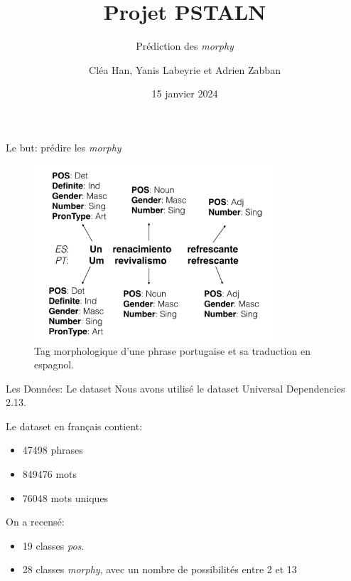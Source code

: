 \documentclass[11pt]{beamer}
\title{Projet PSTALN}
\subtitle{Prédiction des \textit{morphy}}
\author{Cléa Han, Yanis Labeyrie et Adrien Zabban}
\date{15 janvier 2024}
\begin{document}
\maketitle

\begin{frame}{Le but: prédire les \textit{morphy}}
    \begin{figure}[b]
        \centering
        \includegraphics[width=0.8\textwidth]{morphy.png}
        \caption{Tag morphologique d'une phrase portugaise et sa traduction en espagnol.}
    \end{figure}
\end{frame}

\begin{frame}{Les Données: Le dataset}
    Nous avons utilisé le dataset Universal Dependencies 2.13.

    Le dataset en français contient:
    \begin{itemize}
        \item 47498 phrases
        \item 849476 mots
        \item 76048 mots uniques
    \end{itemize}

    On a recensé:
    \begin{itemize}
        \item 19 classes \textit{pos}.
        \item 28 classes \textit{morphy}, avec un nombre de possibilités entre 2 et 13
    \end{itemize}
\end{frame}
\end{document}
